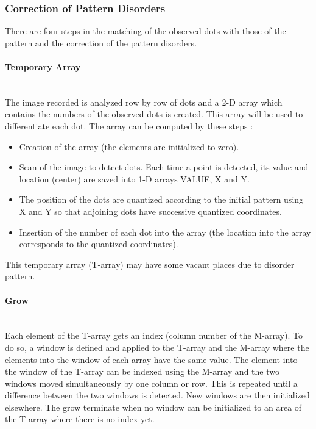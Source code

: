 \subsubsection{Correction of Pattern Disorders}
There are four steps in the matching of the observed dots with those of the pattern and the correction of the pattern disorders.





\paragraph*{Temporary Array}
~~\\
The image recorded is analyzed row by row of dots and a 2-D array which contains the numbers of the observed dots is created. This array will be used to differentiate each dot. The array can be computed by these steps :
\begin{itemize}
\item Creation of the array (the elements are initialized to zero).
\item Scan of the image to detect dots. Each time a point is detected, its value and location (center) are saved into 1-D arrays VALUE, X and Y.
\item The position of the dots are quantized according to the initial pattern using X and Y so that adjoining dots have successive quantized coordinates.
\item Insertion of the number of each dot into the array (the location into the array corresponds to the quantized coordinates).
\end{itemize}

This temporary array (T-array) may have some vacant places due to disorder pattern.

\paragraph*{Grow}
~~\\
Each element of the T-array gets an index (column number of the M-array). To do so, a window is defined and applied to the T-array and the M-array where the elements into the window of each array have the same value. The element into the window of the T-array can be indexed using the M-array and the two windows moved simultaneously by one column or row. This is repeated until a difference between the two windows is detected. New windows are then initialized elsewhere. The grow terminate when no window can be initialized to an area of the T-array where there is no index yet.


